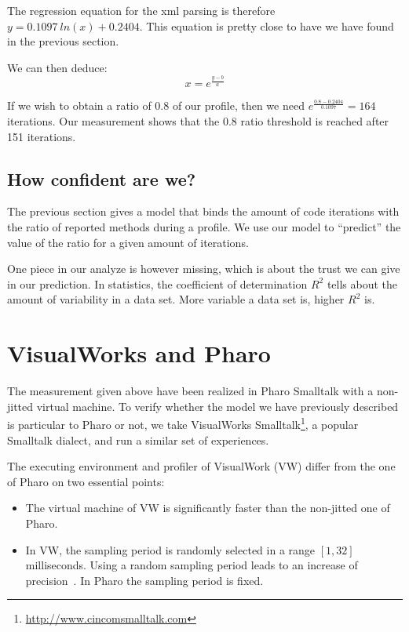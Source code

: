 \documentclass{sig-alternate}
\newcommand{\seclabel}[1]{\label{sec:#1}}
\begin{document}
The regression equation for the xml parsing is therefore $y = 0.1097~ln(x) + 0.2404$. This equation is pretty close to have we have found in the previous section.

We can then deduce:
\[
x = e^{\frac{y-b}{a}}
\]

If we wish to obtain a ratio of 0.8 of our profile, then we need $e^{\frac{0.8 - 0.2404}{0.1097}} = 164$ iterations. Our measurement shows that the 0.8 ratio threshold is reached after 151 iterations.

\subsection{How confident are we?} \seclabel{rSquared}


The previous section gives a model that binds the amount of code iterations with the ratio of reported methods during a profile. We use our model to ``predict'' the value of the ratio for a given amount of iterations.

One piece in our analyze is however missing, which is about the trust we can give in our prediction. In statistics, the coefficient of determination $R^2$ tells about the amount of variability in a data set. More variable a data set is, higher $R^2$ is.



\section{VisualWorks and Pharo}\seclabel{comparison}

The measurement given above have been realized in Pharo Smalltalk with a non-jitted virtual machine. To verify whether the model we have previously described is particular to Pharo or not, we take VisualWorks Smalltalk\footnote{\url{http://www.cincomsmalltalk.com}}, a popular Smalltalk dialect, and run a similar set of experiences.

The executing environment and profiler of VisualWork (VW) differ from the one of Pharo on two essential points:

\begin{itemize}
\item The virtual machine of VW is significantly faster than the non-jitted one of Pharo. 
\item In VW, the sampling period is randomly selected in a range $[1 , 32]$ milliseconds. Using a random sampling period leads to an increase of precision~\cite{Mytk10a}. In Pharo the sampling period is fixed.
\end{itemize}
\end{document}
